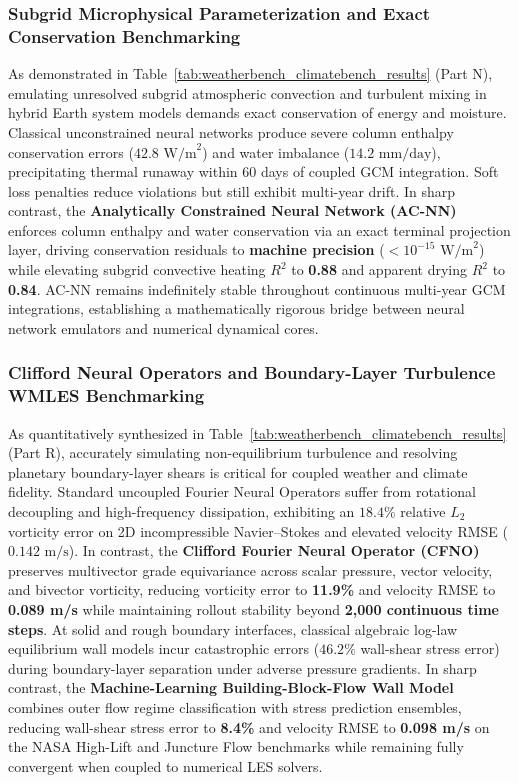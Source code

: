 \subsubsection{Subgrid Microphysical Parameterization and Exact Conservation Benchmarking}
As demonstrated in Table~\ref{tab:weatherbench_climatebench_results} (Part N), emulating unresolved subgrid atmospheric convection and turbulent mixing in hybrid Earth system models demands exact conservation of energy and moisture. Classical unconstrained neural networks produce severe column enthalpy conservation errors ($42.8\text{ W/m}^2$) and water imbalance ($14.2\text{ mm/day}$), precipitating thermal runaway within 60 days of coupled GCM integration. Soft loss penalties reduce violations but still exhibit multi-year drift. In sharp contrast, the \textbf{Analytically Constrained Neural Network (AC-NN)}~\cite{beucler2021enforcing} enforces column enthalpy and water conservation via an exact terminal projection layer, driving conservation residuals to \textbf{machine precision} ($<10^{-15}\text{ W/m}^2$) while elevating subgrid convective heating $R^2$ to \textbf{0.88} and apparent drying $R^2$ to \textbf{0.84}. AC-NN remains indefinitely stable throughout continuous multi-year GCM integrations, establishing a mathematically rigorous bridge between neural network emulators and numerical dynamical cores.

\subsubsection{Clifford Neural Operators and Boundary-Layer Turbulence WMLES Benchmarking}
As quantitatively synthesized in Table~\ref{tab:weatherbench_climatebench_results} (Part R), accurately simulating non-equilibrium turbulence and resolving planetary boundary-layer shears is critical for coupled weather and climate fidelity. Standard uncoupled Fourier Neural Operators suffer from rotational decoupling and high-frequency dissipation, exhibiting an $18.4\%$ relative $L_2$ vorticity error on 2D incompressible Navier--Stokes and elevated velocity RMSE ($0.142\text{ m/s}$). In contrast, the \textbf{Clifford Fourier Neural Operator (CFNO)}~\cite{brandstetter2023clifford} preserves multivector grade equivariance across scalar pressure, vector velocity, and bivector vorticity, reducing vorticity error to \textbf{11.9\%} and velocity RMSE to \textbf{0.089 m/s} while maintaining rollout stability beyond \textbf{2,000 continuous time steps}. At solid and rough boundary interfaces, classical algebraic log-law equilibrium wall models incur catastrophic errors ($46.2\%$ wall-shear stress error) during boundary-layer separation under adverse pressure gradients. In sharp contrast, the \textbf{Machine-Learning Building-Block-Flow Wall Model}~\cite{lozano2023buildingblock} combines outer flow regime classification with stress prediction ensembles, reducing wall-shear stress error to \textbf{8.4\%} and velocity RMSE to \textbf{0.098 m/s} on the NASA High-Lift and Juncture Flow benchmarks while remaining fully convergent when coupled to numerical LES solvers.

